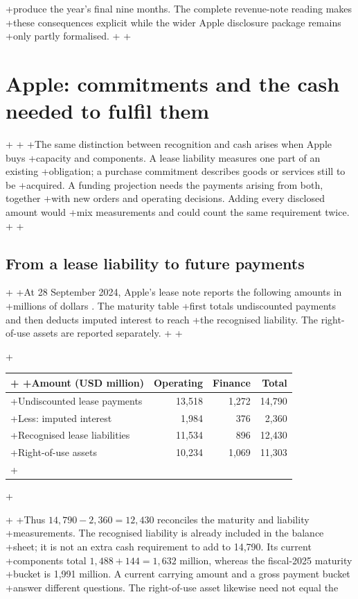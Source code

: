 +produce the year's final nine months. The complete revenue-note reading makes
+these consequences explicit while the wider Apple disclosure package remains
+only partly formalised.
+
+\section{Apple: commitments and the cash needed to fulfil them}
+\label{sec:apple-commitments}
+
+The same distinction between recognition and cash arises when Apple buys
+capacity and components. A lease liability measures one part of an existing
+obligation; a purchase commitment describes goods or services still to be
+acquired. A funding projection needs the payments arising from both, together
+with new orders and operating decisions. Adding every disclosed amount would
+mix measurements and could count the same requirement twice.
+
+\subsection{From a lease liability to future payments}
+
+At 28 September 2024, Apple's lease note reports the following amounts in
+millions of dollars \citep[Note 8, printed p.~42]{apple2024}. The maturity table
+first totals undiscounted payments and then deducts imputed interest to reach
+the recognised liability. The right-of-use assets are reported separately.
+
+\begin{center}
+\begin{tabularx}{\linewidth}{@{}Xrrr@{}}
+\toprule
+Amount (USD million) & Operating & Finance & Total\\\midrule
+Undiscounted lease payments & 13,518 & 1,272 & 14,790\\
+Less: imputed interest & 1,984 & 376 & 2,360\\
+Recognised lease liabilities & 11,534 & 896 & 12,430\\
+Right-of-use assets & 10,234 & 1,069 & 11,303\\\bottomrule
+\end{tabularx}
+\end{center}
+
+Thus $14{,}790-2{,}360=12{,}430$ reconciles the maturity and liability
+measurements. The recognised liability is already included in the balance
+sheet; it is not an extra cash requirement to add to 14,790. Its current
+components total $1{,}488+144=1{,}632$ million, whereas the fiscal-2025 maturity
+bucket is 1,991 million. A current carrying amount and a gross payment bucket
+answer different questions. The right-of-use asset likewise need not equal the

